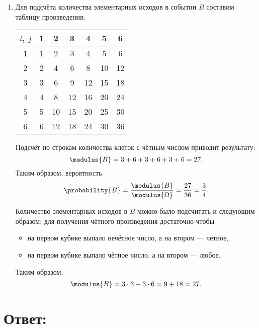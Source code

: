 \begin{enumerate}
    \item
    Для подсчёта количества элементарных исходов в событии $B$ составим таблицу произведения:
    \begin{center}
        \begin{tabular}{c|c|c|c|c|c|c|}
            $i$, $j$ & 1 & 2  & 3  & 4  & 5  & 6  \\
            \hline
            1        & 1 & 2  & 3  & 4  & 5  & 6  \\
            \hline
            2        & 2 & 4  & 6  & 8  & 10 & 12 \\
            \hline
            3        & 3 & 6  & 9  & 12 & 15 & 18 \\
            \hline
            4        & 4 & 8  & 12 & 16 & 20 & 24 \\
            \hline
            5        & 5 & 10 & 15 & 20 & 25 & 30 \\
            \hline
            6        & 6 & 12 & 18 & 24 & 30 & 36 \\
            \hline
        \end{tabular}
    \end{center}
    Подсчёт по строкам количества клеток с чётным числом приводит результату:
    \begin{equation}
        \modulus{B} = 3 + 6 + 3 + 6 + 3 + 6 = 27 .
    \end{equation}
    Таким образом, вероятность
    \begin{equation}
        \probability{B} = \frac{\modulus{B}}{\modulus{\Omega}} = \frac{27}{36} = \frac{3}{4} .
    \end{equation}

    Количество элементарных исходов в $B$ можно было подсчитать и следующим образом: для получения чётного произведения достаточно чтобы
    \begin{itemize}
        \item на первом кубике выпало нечётное число, а на втором --- чётное,
        \item на первом кубике выпало чётное число, а на втором --- любое.
    \end{itemize}
    Таким образом,
    \begin{equation}
        \modulus{B} = 3 \cdot 3 + 3 \cdot 6 = 9 + 18 = 27 .
    \end{equation}
\end{enumerate}

\section*{Ответ:}

